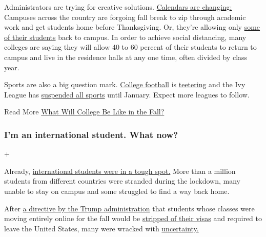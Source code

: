 Administrators are trying for creative solutions.
\href{https://www.nytimes.com/2020/05/19/us/coronavirus-college-fall-semester.html}{Calendars
are changing:} Campuses across the country are forgoing fall break to
zip through academic work and get students home before Thanksgiving. Or,
they're allowing only
\href{https://www.nytimes.com/2020/07/06/us/coronavirus-universities-colleges-reopening.html}{some
of their students} back to campus. In order to achieve social
distancing, many colleges are saying they will allow 40 to 60 percent of
their students to return to campus and live in the residence halls at
any one time, often divided by class year.

Sports are also a big question mark.
\href{https://www.nytimes.com/2020/07/01/sports/ncaafootball/coronavirus-college-football-hbcus-clemson.html}{College
football} is
\href{https://www.nytimes.com/2020/07/10/sports/ncaafootball/coronavirus-college-football-season-canceled.html}{teetering}
and the Ivy League has
\href{https://www.nytimes.com/2020/07/08/sports/ncaafootball/ivy-league-fall-sports-football-coronavirus.html}{suspended
all sports} until January. Expect more leagues to follow.

 Read More
\href{https://www.nytimes.com/2020/06/03/magazine/covid-college-fall.html}{What
Will College Be Like in the Fall?}

\hypertarget{im-an-international-student-what-now}{%
\subsubsection{I'm an international student. What
now?}\label{im-an-international-student-what-now}}

+

Already,
\href{https://www.nytimes.com/2020/04/25/us/coronavirus-international-foreign-students-universities.html}{international
students were in a tough spot.} More than a million students from
different countries were stranded during the lockdown, many unable to
stay on campus and some struggled to find a way back home.

After
\href{https://www.nytimes.com/aponline/2020/07/06/us/politics/ap-us-virus-outbreak-international-students.html}{a
directive by the Trump administration} that students whose classes were
moving entirely online for the fall would be
\href{https://www.nytimes.com/2020/07/07/us/student-visas-coronavirus.html}{stripped
of their visas} and required to leave the United States, many were
wracked with
\href{https://www.nytimes.com/2020/07/09/world/international-students-visa-reaction.html}{uncertainty.}

